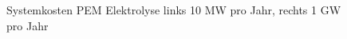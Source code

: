 \begin{figure}
	\centering
	\qquad
	\caption{Systemkosten \gls{PEM} Elektrolyse links 10 MW pro Jahr, rechts 1 GW pro Jahr \cite{IRENA2020}}
	\label{fig:elycost}
\end{figure}


